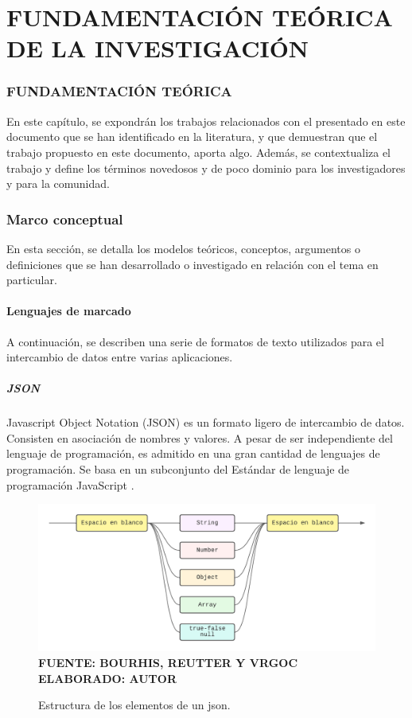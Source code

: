 \setcounter{chapter}{2}
\setcounter{section}{0}
\part{FUNDAMENTACIÓN TEÓRICA DE LA INVESTIGACIÓN}

\section*{FUNDAMENTACIÓN TEÓRICA}
En este capítulo, se expondrán los trabajos relacionados con el presentado en este documento que se han identificado en la literatura, y que demuestran que el trabajo propuesto en este documento, aporta algo. Además, se contextualiza el trabajo y define los términos novedosos y de poco dominio para los investigadores y para la comunidad.

\section{Marco conceptual}

En esta sección, se detalla los modelos teóricos, conceptos, argumentos o definiciones que se han desarrollado o investigado en relación con el tema en particular.

\subsection{Lenguajes de marcado}	

A continuación, se describen una serie de formatos de texto utilizados para el intercambio de datos entre varias aplicaciones.

\subsubsection{JSON}
\sloppy
Javascript Object Notation (JSON) es un formato ligero de intercambio de datos. Consisten en asociación de nombres y valores. A pesar de ser independiente del lenguaje de programación, es admitido en una gran cantidad de lenguajes de programación. Se basa en un subconjunto del Estándar de lenguaje de programación JavaScript \cite{JSON}.


\begin{figure}[h!]
	\centering
	\caption{Estructura de los elementos de un json.}
	\includegraphics[width=12cm]{img/json.png}
	\label{fig:json}
	\vspace{4mm}
	{\footnotesize \textbf{\\ FUENTE: BOURHIS, REUTTER Y VRGOC \cite{JSON} \\ ELABORADO: AUTOR}}
\end{figure}


